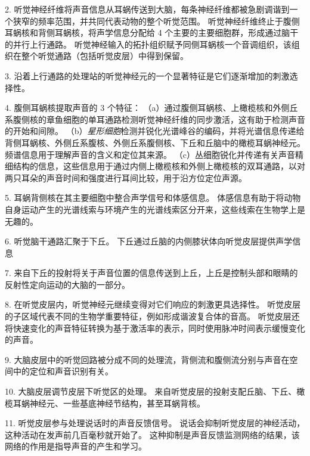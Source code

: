 2. 听觉神经纤维将声音信息从耳蜗传送到大脑，每条神经纤维都被急剧调谐到一个狭窄的频率范围，并共同代表动物的整个听觉范围。
听觉神经纤维终止于腹侧耳蜗核和背侧耳蜗核，将声学信息分配给 4 个主要的主要细胞群，形成通过脑干的并行上行通路。
听觉神经输入的拓扑组织赋予同侧耳蜗核一个音调组织，该组织在整个听觉通路（包括听觉皮层）中得到保留。


3. 沿着上行通路的处理站的听觉神经元的一个显著特征是它们逐渐增加的刺激选择性。


4. 腹侧耳蜗核提取声音的 3 个特征：
（a）通过腹侧耳蜗核、上橄榄核和外侧丘系腹侧核的章鱼细胞的单耳通路检测听觉神经纤维的同步激活，这有助于检测声音的开始和间隙。
（b）\textit{星形细胞}检测并锐化光谱峰谷的编码，并将光谱信息传递给背侧耳蜗核、外侧丘系腹核、外侧丘系腹侧核、下丘和丘脑中的橄榄耳蜗神经元。 
频谱信息用于理解声音的含义和定位其来源。 
（c）丛细胞锐化并传递有关声音精细结构的信息，这些信息用于通过内侧上橄榄核和外侧上橄榄核的双耳通路，以对两只耳朵的声音时间和强度进行耳间比较，用于沿方位定位声源。


5. 耳蜗背侧核在其主要细胞中整合声学信号和体感信息。
体感信息有助于将动物自身运动产生的光谱线索与环境产生的光谱线索区分开来，这些线索在生物学上是无趣的。


6. 听觉脑干通路汇聚于下丘。
下丘通过丘脑的内侧膝状体向听觉皮层提供声学信息

 

7. 来自下丘的投射将关于声音位置的信息传送到上丘，上丘是控制头部和眼睛的反射性定向运动的大脑的一部分。 

8. 在听觉皮层内，听觉神经元继续变得对它们响应的刺激更具选择性。
听觉皮层的子区域代表不同的生物学重要特征，例如形成谐波复合体的音高。
听觉皮层还将快速变化的声音特征转换为基于激活率的表示，同时使用脉冲时间表示缓慢变化的声音。


9. 大脑皮层中的听觉回路被分成不同的处理流，背侧流和腹侧流分别与声音在空间中的定位和声音识别有关。

10. 大脑皮层调节皮层下听觉区的处理。
来自听觉皮层的投射支配丘脑、下丘、橄榄耳蜗神经元、一些基底神经节结构，甚至耳蜗背核。


11. 听觉皮层参与处理说话时的声音反馈信号。
说话会抑制听觉皮层的神经活动，这种活动在发声前几百毫秒就开始了。
这种抑制是声音反馈监测网络的结果，该网络的作用是指导声音的产生和学习。

